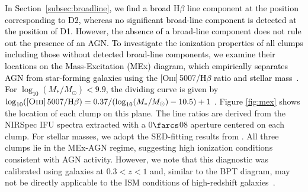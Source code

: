 \documentclass[trackchanges,twocolumn]{aastex701}
\newcommand{\cc}[1]{\textcolor{black}{#1}} %
\newcommand{\ckt}[1]{\textcolor{black}{#1}}
\newcommand{\cj}[1]{\textcolor{black}{#1}}
\newcommand{\ck}[1]{\textcolor{black}{#1}}
\newcommand{\cp}[1]{\textcolor{black}{#1}}
\begin{document}
\ckt{In Section~\ref{subsec:broadline}, we find a broad H$\beta$ line component at the position corresponding to D2, whereas no significant broad-line component is detected at the position of D1. However, the absence of a broad-line component does not rule out the presence of an AGN. }
\cp{To investigate the ionization properties of all clumps including those without detected broad-line components, we examine their locations on the Mass-Excitation (MEx) diagram, which empirically separates AGN from star-forming galaxies using the [\textsc{Oiii}]\,5007/H$\beta$ ratio and stellar mass~\cc{\citep{Juneau2011}}.} \ck{For $\log_{10}(M_*/M_\odot) < 9.9$, the dividing curve is given by $\log_{10}([\textsc{Oiii}]\,5007/\mathrm{H}\beta) = 0.37/(\log_{10}(M_*/M_\odot)-10.5)+1$ \citep{Juneau2011}.} Figure \ref{fig:mex} shows the location of each clump on this plane. The line ratios are derived from the NIRSpec IFU spectra extracted with a 0$\farcs$08 aperture centered on each clump. For stellar masses, we adopt the SED-fitting results from \citet{Harshan2024}. All three clumps lie in the MEx-AGN regime, suggesting high ionization conditions consistent with AGN activity. However, we note that this diagnostic was calibrated using galaxies at $0.3 < z < 1$ and, similar to the BPT diagram, may not be directly applicable to the ISM conditions of high-redshift galaxies~\cj{\citep[e.g.,][]{Kewley2013,Steidel2014,Shapley2015,Sanders2016,Topping2020}. }
\end{document}
